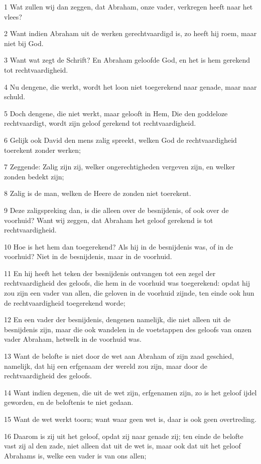 \par 1 Wat zullen wij dan zeggen, dat Abraham, onze vader, verkregen heeft naar het vlees?
\par 2 Want indien Abraham uit de werken gerechtvaardigd is, zo heeft hij roem, maar niet bij God.
\par 3 Want wat zegt de Schrift? En Abraham geloofde God, en het is hem gerekend tot rechtvaardigheid.
\par 4 Nu dengene, die werkt, wordt het loon niet toegerekend naar genade, maar naar schuld.
\par 5 Doch dengene, die niet werkt, maar gelooft in Hem, Die den goddeloze rechtvaardigt, wordt zijn geloof gerekend tot rechtvaardigheid.
\par 6 Gelijk ook David den mens zalig spreekt, welken God de rechtvaardigheid toerekent zonder werken;
\par 7 Zeggende: Zalig zijn zij, welker ongerechtigheden vergeven zijn, en welker zonden bedekt zijn;
\par 8 Zalig is de man, welken de Heere de zonden niet toerekent.
\par 9 Deze zaligspreking dan, is die alleen over de besnijdenis, of ook over de voorhuid? Want wij zeggen, dat Abraham het geloof gerekend is tot rechtvaardigheid.
\par 10 Hoe is het hem dan toegerekend? Als hij in de besnijdenis was, of in de voorhuid? Niet in de besnijdenis, maar in de voorhuid.
\par 11 En hij heeft het teken der besnijdenis ontvangen tot een zegel der rechtvaardigheid des geloofs, die hem in de voorhuid was toegerekend: opdat hij zou zijn een vader van allen, die geloven in de voorhuid zijnde, ten einde ook hun de rechtvaardigheid toegerekend worde;
\par 12 En een vader der besnijdenis, dengenen namelijk, die niet alleen uit de besnijdenis zijn, maar die ook wandelen in de voetstappen des geloofs van onzen vader Abraham, hetwelk in de voorhuid was.
\par 13 Want de belofte is niet door de wet aan Abraham of zijn zaad geschied, namelijk, dat hij een erfgenaam der wereld zou zijn, maar door de rechtvaardigheid des geloofs.
\par 14 Want indien degenen, die uit de wet zijn, erfgenamen zijn, zo is het geloof ijdel geworden, en de beloftenis te niet gedaan.
\par 15 Want de wet werkt toorn; want waar geen wet is, daar is ook geen overtreding.
\par 16 Daarom is zij uit het geloof, opdat zij naar genade zij; ten einde de belofte vast zij al den zade, niet alleen dat uit de wet is, maar ook dat uit het geloof Abrahams is, welke een vader is van ons allen;
